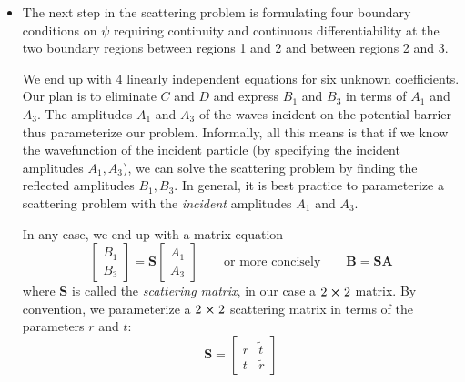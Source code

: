\documentclass[11pt, a4paper]{article}
\newcommand{\eqtext}[1]{\qquad \text{#1} \qquad}
\renewcommand{\vec}[1]{\bm{#1}} %
\newcommand{\mat}[1]{\mathbf{#1}} %
\begin{document}
\begin{itemize}
	\item The next step in the scattering problem is formulating four boundary conditions on $ \psi $ requiring continuity and continuous differentiability at the two boundary regions between regions 1 and 2 and between regions 2 and 3.
	
	We end up with 4 linearly independent equations for six unknown coefficients. Our plan is to eliminate $ C $ and $ D $ and express $ B_{1} $ and $ B_{3} $ in terms of $ A_{1} $ and $ A_{3} $. The amplitudes $ A_{1} $ and $ A_{3} $ of the waves incident on the potential barrier thus parameterize our problem. Informally, all this means is that if we know the wavefunction of the incident particle (by specifying the incident amplitudes $ A_{1}, A_{3} $), we can solve the scattering problem by finding the reflected amplitudes $ B_{1}, B_{3} $. In general, it is best practice to parameterize a scattering problem with the \textit{incident} amplitudes $ A_{1} $ and $ A_{3} $. 
	
	In any case, we end up with a matrix equation
	\begin{equation*}
		\begin{bmatrix}
			B_{1}\\
			B_{3}
		\end{bmatrix}
		= 
		\mat{S}
		\begin{bmatrix}
			A_{1}\\
			A_{3}
		\end{bmatrix}
		\eqtext{or more concisely} \vec{B} = \mat{S} \vec{A}
	\end{equation*}
	where $ \mat{S} $ is called the \textit{scattering matrix}, in our case a $ 2 \cross 2 $ matrix. By convention, we parameterize a $ 2 \cross 2 $ scattering matrix in terms of the parameters $ r $ and $ t $:
	\begin{equation*}
		\mat{S} = 
		\begin{bmatrix}
			r & \tilde{t}\\
			t & \tilde{r}
		\end{bmatrix}
	\end{equation*} 
\end{itemize}
\end{document}
